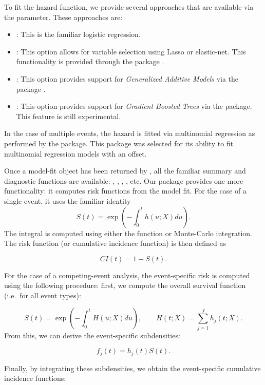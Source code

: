 \documentclass[
]{jss}
\providecommand{\tightlist}{%
  \setlength{\itemsep}{0pt}\setlength{\parskip}{0pt}}
\begin{document}
To fit the hazard function, we provide several approaches that are
available via the  parameter. These approaches are:

\begin{itemize}
\tightlist
\item
  : This is the familiar logistic regression.
\item
  : This option allows for variable selection using Lasso
  or elastic-net. This functionality is provided through the
   package \citep{friedman2010jss}.
\item
  : This option provides support for \emph{Generalized
  Additive Models} via the  package
  \citep{hastie1987generalized}.
\item
  : This option provides support for \emph{Gradient Boosted
  Trees} via the  package. This feature is still experimental.
\end{itemize}

In the case of multiple events, the hazard is fitted via multinomial
regression as performed by the  package. This package was
selected for its ability to fit multinomial regression models with an
offset.

Once a model-fit object has been returned by , all
the familiar summary and diagnostic functions are available:
, , , , etc. Our
package provides one more functionality: it computes risk functions from
the model fit. For the case of a single event, it uses the familiar
identity \[S(t) = \exp\left(-\int_0^t h(u;X) du\right).\] The integral
is computed using either the  function or
Monte-Carlo integration. The risk function (or cumulative incidence
function) is then defined as

\[ CI(t) = 1 - S(t).\]

For the case of a competing-event analysis, the event-specific risk is
computed using the following procedure: first, we compute the overall
survival function (i.e.~for all event types):

\[ S(t) = \exp\left(-\int_0^t H(u;X) du\right),\qquad H(t;X) = \sum_{j=1}^J h_j(t;X).\]
From this, we can derive the event-specific subdensities:

\[ f_j(t) = h_j(t)S(t).\]

Finally, by integrating these subdensities, we obtain the event-specific
cumulative incidence functions:
\end{document}
